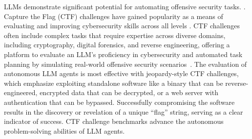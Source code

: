 LLMs demonstrate significant potential for automating offensive security tasks. \cite{bhatt2024cyberseceval, wan2024cyberseceval3advancingevaluation}.
Capture the Flag (CTF) challenges have gained popularity as a means of evaluating and improving cybersecurity skills across all levels \cite{chicone2018using, vykopal2020benefits}. CTF challenges often include complex tasks that require expertise across diverse domains, including cryptography, digital forensics, and reverse engineering, offering a platform to evaluate an LLM’s proficiency in cybersecurity and automated task planning by simulating real-world offensive security scenarios~\cite{tann2023using, yang2023language, shao2024nyu, savin2023battle, pieterse2024friend}.
The evaluation of autonomous LLM agents is most effective with jeopardy-style CTF challenges, which emphasize exploiting standalone software like a binary that can be reverse-engineered, encrypted data that can be decrypted, or a web server with authentication that can be bypassed. Successfully compromising the software results in the discovery or revelation of a unique ``flag'' string, serving as a clear indicator of success. %
CTF challenge benchmarks \cite{zhang2024cybenchframeworkevaluatingcybersecurity, shao2024nyu}  advance the  autonomous problem-solving abilities of LLM agents.




